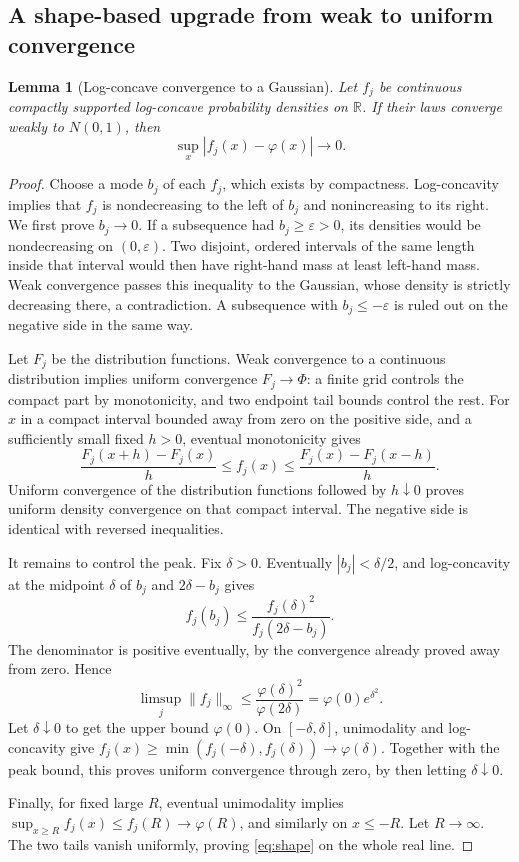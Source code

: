 \documentclass[11pt,a4paper]{article}
\numberwithin{equation}{section}
\newtheorem{lemma}[lemma]{Lemma}
\theoremstyle{definition}
\theoremstyle{remark}
\newcommand{\R}{\mathbb R}
\newcommand{\phiN}{\varphi}
\newcommand{\PhiN}{\Phi}
\begin{document}
\subsection{A shape-based upgrade from weak to uniform convergence}
\begin{lemma}[Log-concave convergence to a Gaussian]\label{lem:shape}
Let $f_j$ be continuous compactly supported log-concave probability
densities on $\R$. If their laws converge weakly to $N(0,1)$, then
\begin{equation}\label{eq:shape}
 \sup_x|f_j(x)-\phiN(x)|\longrightarrow0.
\end{equation}
\end{lemma}
\begin{proof}
Choose a mode $b_j$ of each $f_j$, which exists by compactness.
Log-concavity implies that $f_j$ is nondecreasing to the left of
$b_j$ and nonincreasing to its right. We first prove $b_j\to0$.
If a subsequence had $b_j\ge\varepsilon>0$, its densities would be
nondecreasing on $(0,\varepsilon)$. Two disjoint, ordered intervals
of the same length inside that interval would then have right-hand
mass at least left-hand mass. Weak convergence passes this
inequality to the Gaussian, whose density is strictly decreasing
there, a contradiction. A subsequence with $b_j\le-\varepsilon$
is ruled out on the negative side in the same way.

Let $F_j$ be the distribution functions. Weak convergence to a
continuous distribution implies uniform convergence
$F_j\to\PhiN$: a finite grid controls the compact part by
monotonicity, and two endpoint tail bounds control the rest.
For $x$ in a compact interval bounded away from zero on the
positive side, and a sufficiently small fixed $h>0$, eventual
monotonicity gives
\[
 \frac{F_j(x+h)-F_j(x)}h\le f_j(x)
 \le\frac{F_j(x)-F_j(x-h)}h.
\]
Uniform convergence of the distribution functions followed by
$h\downarrow0$ proves uniform density convergence on that compact
interval. The negative side is identical with reversed
inequalities.

It remains to control the peak. Fix $\delta>0$. Eventually
$|b_j|<\delta/2$, and log-concavity at the midpoint $\delta$ of
$b_j$ and $2\delta-b_j$ gives
\[
 f_j(b_j)\le\frac{f_j(\delta)^2}{f_j(2\delta-b_j)}.
\]
The denominator is positive eventually, by the convergence already
proved away from zero. Hence
\[
 \limsup_j\|f_j\|_\infty
 \le\frac{\phiN(\delta)^2}{\phiN(2\delta)}
 =\phiN(0)e^{\delta^2}.
\]
Let $\delta\downarrow0$ to get the upper bound $\phiN(0)$.
On $[-\delta,\delta]$, unimodality and log-concavity give
$f_j(x)\ge\min(f_j(-\delta),f_j(\delta))\to\phiN(\delta)$.
Together with the peak bound, this proves uniform convergence
through zero, by then letting $\delta\downarrow0$.

Finally, for fixed large $R$, eventual unimodality implies
$\sup_{x\ge R}f_j(x)\le f_j(R)\to\phiN(R)$, and similarly on
$x\le-R$. Let $R\to\infty$. The two tails vanish uniformly,
proving \cref{eq:shape} on the whole real line.
\end{proof}
\end{document}
